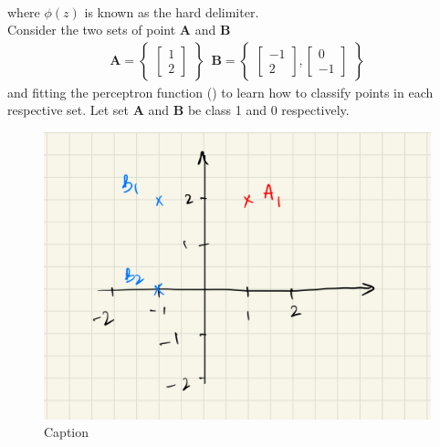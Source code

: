 \vspace{5mm}
\\
where $\phi(z)$ is known as the hard delimiter.
\vspace{5mm}
\\
\noindent Consider the two sets of point \textbf{A} and \textbf{B} 
\begin{align}
  \textbf{A} =
  \begin{Bmatrix}
    \begin{bmatrix}
      1 \\ 
      2
    \end{bmatrix}
  \end{Bmatrix}
   \, \, \, 
  \textbf{B} =
\begin{Bmatrix}
  \begin{bmatrix}
    -1 \\
    2
  \end{bmatrix},
  \begin{bmatrix}
    0 \\
    -1
  \end{bmatrix}
  \end{Bmatrix}
\end{align}
and fitting the perceptron function () to learn how to classify points in each respective set. Let set \textbf{A} and \textbf{B} be class 1 and 0 respectively.
\begin{figure}[ht]
  \centering
  \includegraphics[scale=0.15]{CHAPTER_2/c2_fig_perceptron_example_1.jpeg}
  \caption{Caption}
  \label{fig:perceptron_example_1}
\end{figure}\\
